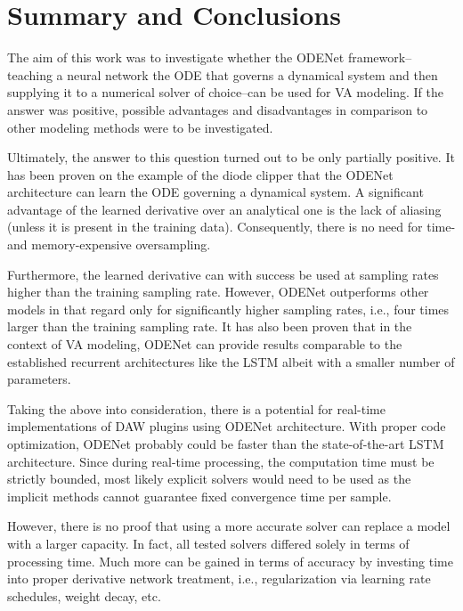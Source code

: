 \chapter{Summary and Conclusions}
\label{chapter:conclusions}

The aim of this work was to investigate whether the ODENet framework--teaching a neural network the \acl{ODE} that governs a dynamical system and then supplying it to a numerical solver of choice--can be used for \acl{VA} modeling. If the answer was positive, possible advantages and disadvantages in comparison to other modeling methods were to be investigated.

Ultimately, the answer to this question turned out to be only partially positive. It has been proven on the example of the diode clipper that the ODENet architecture can learn the \ac{ODE} governing a dynamical system. A significant advantage of the learned derivative over an analytical one is the lack of aliasing (unless it is present in the training data). Consequently, there is no need for time- and memory-expensive oversampling.

Furthermore, the learned derivative can with success be used at sampling rates higher than the training sampling rate. However, ODENet outperforms other models in that regard only for significantly higher sampling rates, i.e., four times larger than the training sampling rate. It has also been proven that in the context of \ac{VA} modeling, ODENet can provide results comparable to the established recurrent architectures like the \ac{LSTM} albeit with a smaller number of parameters.

Taking the above into consideration, there is a potential for real-time implementations of \ac{DAW} plugins using ODENet architecture. With proper code optimization, ODENet probably could be faster than the state-of-the-art \ac{LSTM} architecture. Since during real-time processing, the computation time must be strictly bounded, most likely explicit solvers would need to be used as the implicit methods cannot guarantee fixed convergence time per sample.

However, there is no proof that using a more accurate solver can replace a model with a larger capacity. In fact, all tested solvers differed solely in terms of processing time. Much more can be gained in terms of accuracy by investing time into proper derivative network treatment, i.e., regularization via learning rate schedules, weight decay, etc.

